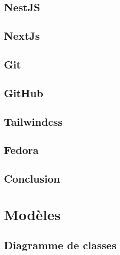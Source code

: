 \documentclass[12pt, a4paper]{report}
\begin{document}
    \subsection{NestJS}\label{sec:nestjs}
    

    \subsection{NextJs}\label{sec:nextjs}
    

    \subsection{Git}\label{sec:git}
    

    \subsection{GitHub}\label{sec:github}
    

    \subsection{Tailwindcss}\label{sec:tailwind}
    

    \subsection{Fedora}\label{sec:fedora}
    

    \subsection*{Conclusion}\label{sec:conclusion-choix-techniques}
    

    \newpage
    \section{Modèles}\label{sec:database-models}
    \subsection{Diagramme de classes}\label{subsec:class-diagram}
    
\end{document}
